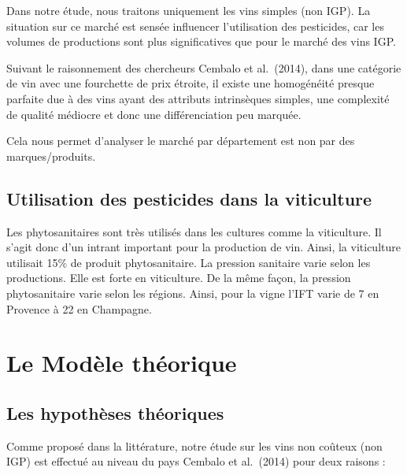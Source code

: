 \documentclass[11pt,]{article}
\begin{document}
\par

Dans notre étude, nous traitons uniquement les vins simples (non IGP).
La situation sur ce marché est sensée influencer l'utilisation des
pesticides, car les volumes de productions sont plus significatives que
pour le marché des vins IGP.

\par

Suivant le raisonnement des chercheurs Cembalo et al.~(2014), dans une
catégorie de vin avec une fourchette de prix étroite, il existe une
homogénéité presque parfaite due à des vins ayant des attributs
intrinsèques simples, une complexité de qualité médiocre et donc une
différenciation peu marquée.

\par

Cela nous permet d'analyser le marché par département est non par des
marques/produits.

\hypertarget{utilisation-des-pesticides-dans-la-viticulture}{%
\subsection{Utilisation des pesticides dans la
viticulture}\label{utilisation-des-pesticides-dans-la-viticulture}}

Les phytosanitaires sont très utilisés dans les cultures comme la
viticulture. Il s'agit donc d'un intrant important pour la production de
vin. Ainsi, la viticulture utilisait 15\% de produit phytosanitaire. La
pression sanitaire varie selon les productions. Elle est forte en
viticulture. De la même façon, la pression phytosanitaire varie selon
les régions. Ainsi, pour la vigne l'IFT varie de 7 en Provence à 22 en
Champagne.

\hypertarget{le-modele-theorique}{%
\section{Le Modèle théorique}\label{le-modele-theorique}}

\hypertarget{les-hypotheses-theoriques}{%
\subsection{Les hypothèses théoriques}\label{les-hypotheses-theoriques}}

Comme proposé dans la littérature, notre étude sur les vins non coûteux
(non IGP) est effectué au niveau du pays Cembalo et al.~(2014) pour deux
raisons :
\end{document}

